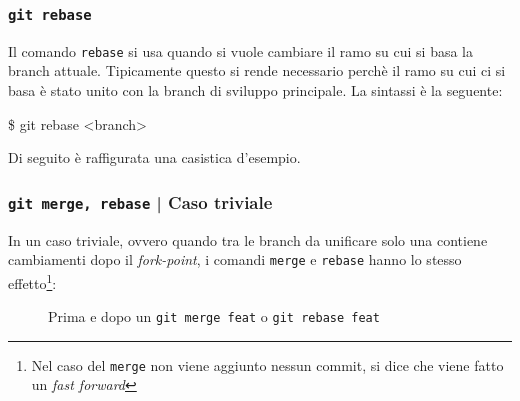 \documentclass{beamer}
\begin{document}
\begin{frame}
  \frametitle{\texttt{git rebase}}
  Il comando \texttt{rebase} si usa quando si vuole cambiare il ramo su cui si
  basa la branch attuale. Tipicamente questo si rende necessario perch\`e il
  ramo su cui ci si basa \`e stato unito con la branch di sviluppo principale.
  La sintassi \`e la seguente:
  \begin{semiverbatim}
  \$ git rebase <branch>
  \end{semiverbatim}
  Di seguito \`e raffigurata una casistica d'esempio.

  \begin{figure}
  \end{figure}
\end{frame}

\begin{frame}
  \label{trivial}
  \frametitle{\texttt{git merge, rebase} | Caso triviale}
  In un caso triviale, ovvero quando tra le branch da unificare solo una contiene
  cambiamenti dopo il \emph{fork-point}, i comandi \texttt{merge} e \texttt{rebase}
  hanno lo stesso effetto\footnote{Nel caso del \texttt{merge} non viene
  aggiunto nessun commit, si dice che viene fatto un \emph{fast forward}}:
  \begin{figure}
    \centering
    \quad
    \caption{Prima e dopo un \texttt{git merge feat} o \texttt{git rebase feat}}
  \end{figure}
\end{frame}
\end{document}
